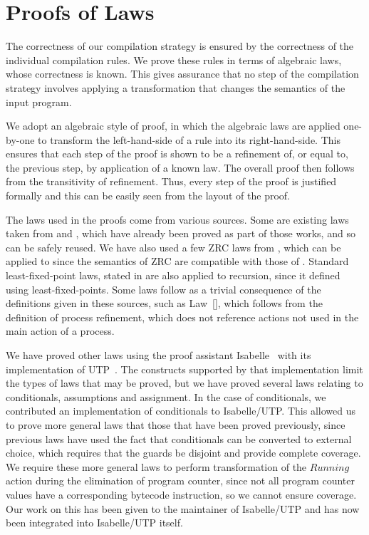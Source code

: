 \section{Proofs of Laws}
\label{proofs-of-laws-section}

The correctness of our compilation strategy is ensured by the
correctness of the individual compilation rules.
We prove these rules in terms of algebraic laws, whose correctness is
known.
This gives assurance that no step of the compilation strategy involves
applying a transformation that changes the semantics of the input
program.

We adopt an algebraic style of proof, in which the algebraic laws are
applied one-by-one to transform the left-hand-side of a rule into its
right-hand-side.
This ensures that each step of the proof is shown to be a refinement
of, or equal to, the previous step, by application of a known law.
The overall proof then follows from the transitivity of refinement.
Thus, every step of the proof is justified formally and this can be
easily seen from the layout of the proof.

The laws used in the proofs come from various sources.
Some are existing laws taken from \cite{oliveira2006} and
\cite{miyazawa2012}, which have already been proved as part of those
works, and so can be safely reused.
We have also used a few ZRC laws from \cite{cavalcanti1998}, which can
be applied to \Circus{} since the semantics of ZRC are compatible with
those of \Circus{}.
Standard least-fixed-point laws, stated in \cite{hoare1998} are also
applied to \Circus recursion, since it defined using
least-fixed-points.
Some laws follow as a trivial consequence of the definitions given in
these sources, such as Law~[], which follows
from the definition of process refinement, which does not reference
actions not used in the main action of a process.

We have proved other laws using the proof assistant
Isabelle~\cite{nipkow2002} with its implementation of
UTP~\cite{foster2015}.
The constructs supported by that implementation limit the types of
laws that may be proved, but we have proved several laws relating to
conditionals, assumptions and assignment.
In the case of conditionals, we contributed an implementation of
\Circus{} conditionals to Isabelle/UTP.
This allowed us to prove more general laws that those that have been
proved previously, since previous laws have used the fact that
conditionals can be converted to external choice, which requires that
the guards be disjoint and provide complete coverage.
We require these more general laws to perform transformation of the
$Running$ action during the elimination of program counter, since not
all program counter values have a corresponding bytecode instruction,
so we cannot ensure coverage.
Our work on this has been given to the maintainer of Isabelle/UTP and
has now been integrated into Isabelle/UTP itself.


